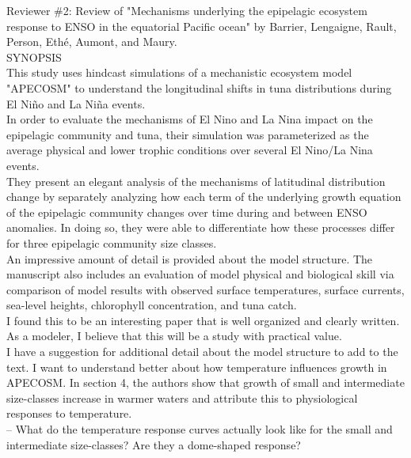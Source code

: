 \documentclass{article}
\begin{document}
Reviewer \#2: Review of "Mechanisms underlying the epipelagic ecosystem response to ENSO in the equatorial Pacific ocean" by Barrier, Lengaigne, Rault, Person, Ethé, Aumont, and Maury.\\

SYNOPSIS \\

This study uses hindcast simulations of a mechanistic ecosystem model "APECOSM" to understand the longitudinal shifts in tuna distributions during El Niño and La Niña events.\\

In order to evaluate the mechanisms of El Nino and La Nina impact on the epipelagic community and tuna, their simulation was parameterized as the average physical and lower trophic conditions over several El Nino/La Nina events.\\

They present an elegant analysis of the mechanisms of latitudinal distribution change by separately analyzing how each term of the underlying growth equation of the epipelagic community changes over time during and between ENSO anomalies. In doing so, they were able to differentiate how these processes differ for three epipelagic community size classes.\\

An impressive amount of detail is provided about the model structure. The manuscript also includes an evaluation of model physical and biological skill via comparison of model results with observed surface temperatures, surface currents, sea-level heights, chlorophyll concentration, and tuna catch.\\

I found this to be an interesting paper that is well organized and clearly written. As a modeler, I believe that this will be a study with practical value.\\

I have a suggestion for additional detail about the model structure to add to the text. I want to understand better about how temperature influences growth in APECOSM. In section 4, the authors show that growth of small and intermediate size-classes increase in warmer waters and attribute this to physiological responses to temperature.\\

-- What do the temperature response curves actually look like for the small and intermediate size-classes? Are they a dome-shaped response?\\
\end{document}
